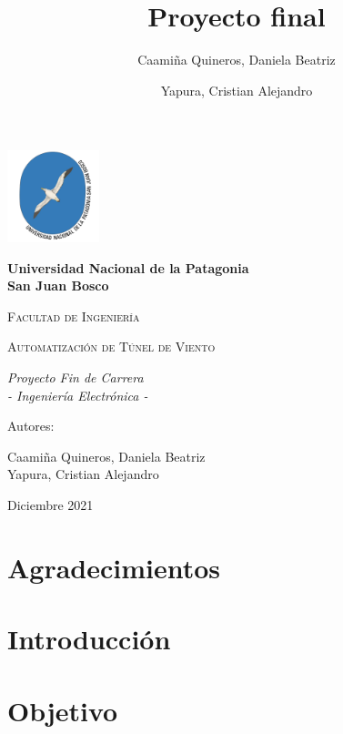 \documentclass[12pt,a4paper]{article}
\author{Caamiña Quineros, Daniela Beatriz\\ \and Yapura, Cristian Alejandro}
\title{Proyecto final}
\begin{document}
\begin{titlepage}
	\centering
	{\includegraphics[width=0.2\textwidth]{unpsjb.png}\par}
	\vspace{1cm}
	{\bfseries\LARGE Universidad Nacional de la Patagonia\\ San Juan Bosco \par}
	\vspace{1cm}
	{\scshape\Large Facultad de Ingenier\'ia \par}
	\vspace{3cm}
	{\scshape\Huge Automatización de Túnel de Viento \par}
	\vspace{3cm}
	{\itshape\Large Proyecto Fin de Carrera\\ - Ingeniería Electrónica - \par}
	\vfill
	{\Large Autores: \par}
	{\Large Caamiña Quineros, Daniela Beatriz\\ Yapura, Cristian Alejandro \par}
	\vfill
	{\Large Diciembre 2021 \par}
	\end{titlepage}



\newpage

\section*{Agradecimientos}

\newpage

	\tableofcontents
	\newpage
	\listoffigures
	\newpage
	\listoftables
	\newpage


	\section{Introducción}
	

	\section{Objetivo}
	
\end{document}
